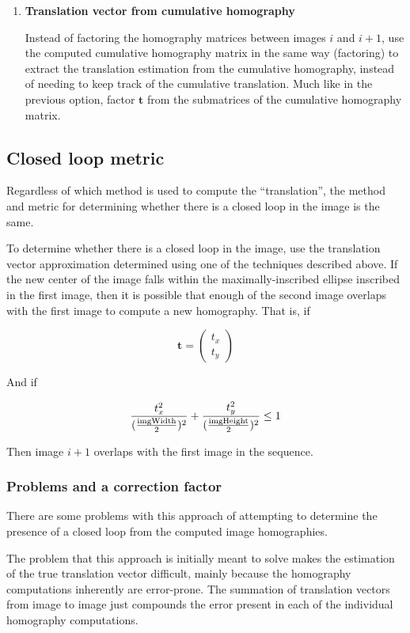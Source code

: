 \documentclass{article}
\begin{document}
\begin{enumerate}
\item \textbf{Translation vector from cumulative homography}

Instead of factoring the homography matrices between images $i$ and $i + 1$,
use the computed cumulative homography matrix in the same way (factoring) to
extract the translation estimation from the cumulative homography, instead of
needing to keep track of the cumulative translation. Much like in the previous
option, factor $\mathbf{t}$ from the submatrices of the cumulative homography
matrix.  

\end{enumerate}

\subsection{Closed loop metric}
\label{sec:clmetric}

Regardless of which method is used to compute the ``translation'', the method
and metric for determining whether there is a closed loop in the image is the
same. 

To determine whether there is a closed loop in the image, use the translation
vector approximation determined using one of the techniques described above. If
the new center of the image falls within the maximally-inscribed ellipse
inscribed in the first image, then it is possible that enough of the second
image overlaps with the first image to compute a new homography. That is, if

\[\mathbf{t} = \begin{pmatrix} t_x \\ t_y \end{pmatrix}\]

And if 

\[\frac{t_x^2}{(\frac{\textnormal{imgWidth}}{2})^2} + \frac{t_y^2}{(\frac{\textnormal{imgHeight}}{2})^2} \leq 1\]

Then image $i + 1$ overlaps with the first image in the sequence.

\subsubsection{Problems and a correction factor}

There are some problems with this approach of attempting to determine the
presence of a closed loop from the computed image homographies.

The problem that this approach is initially meant to solve makes the estimation
of the true translation vector difficult, mainly because the homography
computations inherently are error-prone. The summation of translation vectors
from image to image just compounds the error present in each of the individual
homography computations. 
\end{document}
